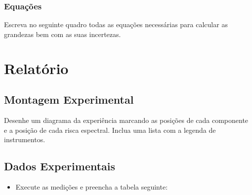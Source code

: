 \documentclass[a4paper,12pt]{article}  %
\begin{document}
\subsubsection{\sf Equações }
Escreva no seguinte quadro todas as equações necessárias para calcular as grandezas bem com as suas incertezas.
\begin{center}
\framebox[15cm]{\rule{0pt}{6.5cm}}
\end{center}


\section{\sf Relatório}
\subsection{\sf Montagem Experimental}
Desenhe um diagrama da experiência marcando as posições de cada componente e a posição de cada risca espectral. Inclua uma lista com a  legenda de instrumentos.

\begin{center}
\framebox[18cm]{\rule{0pt}{6.5cm}}
\end{center}



\subsection{\sf Dados Experimentais}\label{sec:dados}

\begin{itemize}
\item Execute as medições e preencha a tabela seguinte:
\end{itemize}
\end{document}
